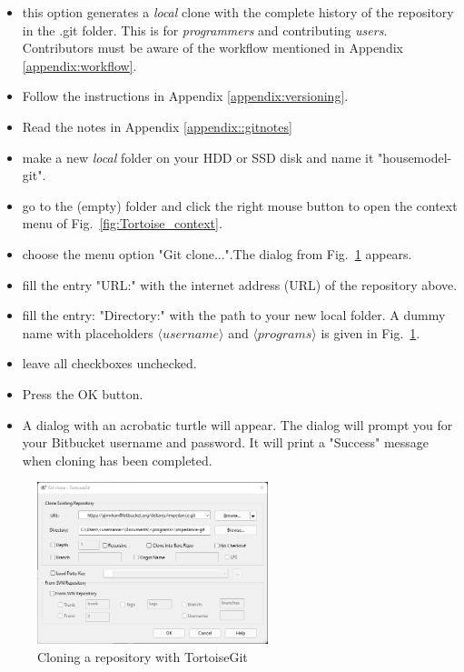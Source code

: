 \begin{itemize}
	\item this option generates a \emph{local} clone with the complete history of the repository in the \textsf{.git} folder. This is for \emph{programmers} and contributing \emph{users}. Contributors must be aware of the workflow mentioned in Appendix \ref{appendix:workflow}.
    \item Follow the instructions in Appendix \ref{appendix:versioning}. 
    \item Read the notes in Appendix \ref{appendix::gitnotes}
	\item make a new \emph{local} folder on your HDD or SSD disk and name it \textsf{"housemodel-git"}.
	\item go to the (empty) folder and click the right mouse button to open the context menu of Fig.~\ref{fig:Tortoise_context}.
	\item choose the menu option \textsf{"Git clone..."}.The dialog from Fig.~\ref{fig:clone} appears.
	\item fill the entry \textsf{"URL:"} with the internet address (URL) of the repository above.
	\item fill the entry: \textsf{"Directory:"} with the path to your new local folder. A dummy name with placeholders $\langle username \rangle$ and $\langle programs \rangle$ is given in Fig.~\ref{fig:clone}. 
	\item leave all checkboxes unchecked.
	\item Press the OK button.
	\item A dialog with an acrobatic turtle will appear. The dialog will prompt you for your Bitbucket username and password. It will print a "Success" message when cloning has been completed.
\end{itemize}

\begin{figure}[H]
	\centering
	\includegraphics[width=0.6\textwidth]{Figures/Tortoise_clone_impedance}
	\caption{Cloning a repository with TortoiseGit}
	\label{fig:clone}
\end{figure}

